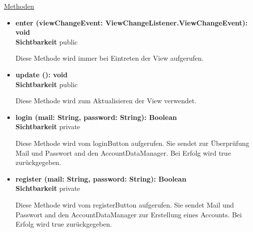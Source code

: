 \underline{Methoden}
\begin{itemize}
\itemsep0pt
\item \textbf{enter (viewChangeEvent: ViewChangeListener.ViewChangeEvent): void}\hfill\\
\textbf{Sichtbarkeit} public

Diese Methode wird immer bei Eintreten der View aufgerufen.

\item \textbf{update (): void}\hfill\\
\textbf{Sichtbarkeit} public

Diese Methode wird zum Aktualisieren der View verwendet.

\item \textbf{login (mail: String, password: String): Boolean} \hfill\\ 
\textbf{Sichtbarkeit} private

Diese Methode wird vom loginButton aufgerufen. Sie sendet zur Überprüfung Mail und Passwort and den AccountDataManager. Bei Erfolg wird true zurückgegeben.

\item \textbf{register (mail: String, password: String): Boolean}\hfill\\
\textbf{Sichtbarkeit} private

Diese Methode wird vom registerButton aufgerufen. Sie sendet Mail und Passwort and den AccountDataManager zur Erstellung eines Accounts. Bei Erfolg wird true zurückgegeben.

\end{itemize}

